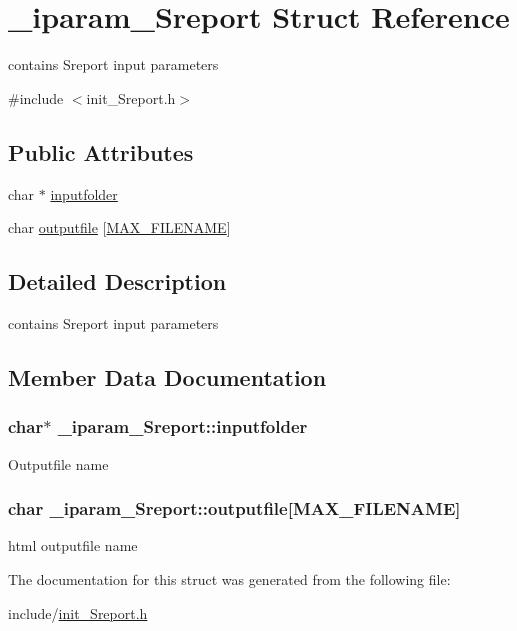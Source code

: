 \hypertarget{struct__iparam__Sreport}{\section{\+\_\+iparam\+\_\+\+Sreport Struct Reference}
\label{struct__iparam__Sreport}
}


contains Sreport input parameters  




{\ttfamily \#include $<$init\+\_\+\+Sreport.\+h$>$}

\subsection*{Public Attributes}
\begin{DoxyCompactItemize}
\item 
char $\ast$ \hyperlink{struct__iparam__Sreport_af5521a185f440566547b4b11b9fac6a4}{inputfolder}
\item 
char \hyperlink{struct__iparam__Sreport_aab71d9b5647daf65a8ba9ba6f7a35ee5}{outputfile} \mbox{[}\hyperlink{defines_8h_abe0ec333b60117063f9b9fd9f849cb08}{M\+A\+X\+\_\+\+F\+I\+L\+E\+N\+A\+M\+E}\mbox{]}
\end{DoxyCompactItemize}


\subsection{Detailed Description}
contains Sreport input parameters 

\subsection{Member Data Documentation}
\hypertarget{struct__iparam__Sreport_af5521a185f440566547b4b11b9fac6a4}{
\subsubsection[{inputfolder}]{\setlength{\rightskip}{0pt plus 5cm}char$\ast$ \+\_\+iparam\+\_\+\+Sreport\+::inputfolder}}\label{struct__iparam__Sreport_af5521a185f440566547b4b11b9fac6a4}
Outputfile name \hypertarget{struct__iparam__Sreport_aab71d9b5647daf65a8ba9ba6f7a35ee5}{
\subsubsection[{outputfile}]{\setlength{\rightskip}{0pt plus 5cm}char \+\_\+iparam\+\_\+\+Sreport\+::outputfile\mbox{[}{\bf M\+A\+X\+\_\+\+F\+I\+L\+E\+N\+A\+M\+E}\mbox{]}}}\label{struct__iparam__Sreport_aab71d9b5647daf65a8ba9ba6f7a35ee5}
html outputfile name 

The documentation for this struct was generated from the following file\+:\begin{DoxyCompactItemize}
\item 
include/\hyperlink{init__Sreport_8h}{init\+\_\+\+Sreport.\+h}\end{DoxyCompactItemize}
